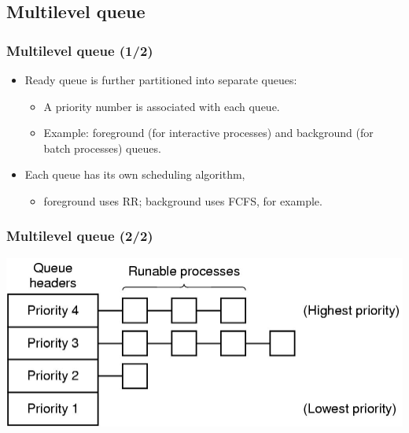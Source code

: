 \documentclass[CJKutf8,xcolor=pdftex,dvipsnames,table]{beamer}
\begin{document}
\begin{CJK*}{UTF8}{song}
  \subsection{Multilevel queue}

  \begin{frame}
  \frametitle{Multilevel queue (1/2)} \pause
  \begin{itemize}
  \item{Ready queue is further partitioned into separate queues:} \pause
    \begin{itemize}
    \item{A priority number is associated with each queue.} \pause
    \item{Example: foreground (for interactive processes) and background (for batch processes) queues.} \pause
    \end{itemize}
  \item{Each queue has its own scheduling algorithm,} \pause
    \begin{itemize}
    \item{foreground uses RR; background uses FCFS, for example.} \pause
    \end{itemize}
  \end{itemize}
  \end{frame}
  
  \begin{frame}
  \frametitle{Multilevel queue (2/2)} \pause
  \begin{center}
    \includegraphics[scale=0.35]{mosv2f2-42}
  \end{center}
  \end{frame}
  

\end{CJK*}
\end{document}
